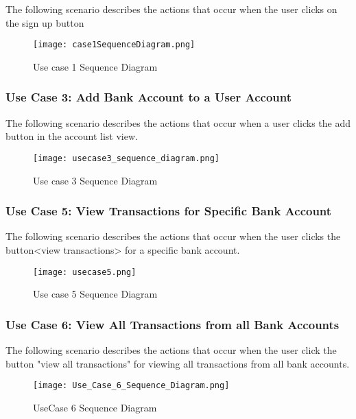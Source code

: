 \documentclass[12pt]{article}
\begin{document}
The following scenario describes the actions that occur when the user clicks on the sign up button

\begin{figure}[H]
\texttt{[image: case1SequenceDiagram.png]}
\caption{Use case 1 Sequence Diagram}
\label{fig:use-case-1-sequence-diagram}
\end{figure}

\clearpage

\subsubsection{Use Case 3: Add Bank Account to a User Account}

The following scenario describes the actions that occur when a user clicks the add button in the account list view.

\begin{figure}[H]
\texttt{[image: usecase3\_sequence\_diagram.png]}
\caption{Use case 3 Sequence Diagram}
\label{fig:use-case-3-sequence-diagram}
\end{figure}

\clearpage

\subsubsection{Use Case 5: View Transactions for Specific Bank Account}

The following scenario describes the actions that occur when the user clicks the button<view transactions> for a specific bank account.

\begin{figure}[H]
\texttt{[image: usecase5.png]}
\caption{Use case 5 Sequence Diagram}
\label{fig:use-case-5-sequence-diagram}
\end{figure}

\clearpage

\clearpage

\subsubsection{Use Case 6: View All Transactions from all Bank Accounts}

The following scenario describes the actions that occur when the user click the button "view all transactions" for viewing all transactions from all bank accounts.

\begin{figure}[H]
\texttt{[image: Use\_Case\_6\_Sequence\_Diagram.png]}
\caption{UseCase 6 Sequence Diagram}
\label{fig:use-case-6-sequence-diagram}
\end{figure}
\end{document}
